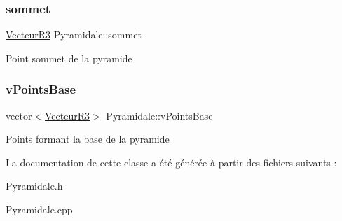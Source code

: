 \subsubsection{\texorpdfstring{sommet}{sommet}}
{\footnotesize\ttfamily \mbox{\hyperlink{class_vecteur_r3}{Vecteur\+R3}} Pyramidale\+::sommet\hspace{0.3cm}{\ttfamily [protected]}}

Point sommet de la pyramide \mbox{\label{class_pyramidale_a3c8f1d8480417e91a65daa4f6d55c0ed}} 
\subsubsection{\texorpdfstring{v\+Points\+Base}{vPointsBase}}
{\footnotesize\ttfamily vector$<$\mbox{\hyperlink{class_vecteur_r3}{Vecteur\+R3}}$>$ Pyramidale\+::v\+Points\+Base\hspace{0.3cm}{\ttfamily [protected]}}

Points formant la base de la pyramide 

La documentation de cette classe a été générée à partir des fichiers suivants \+:\begin{DoxyCompactItemize}
\item 
Pyramidale.\+h\item 
Pyramidale.\+cpp\end{DoxyCompactItemize}

